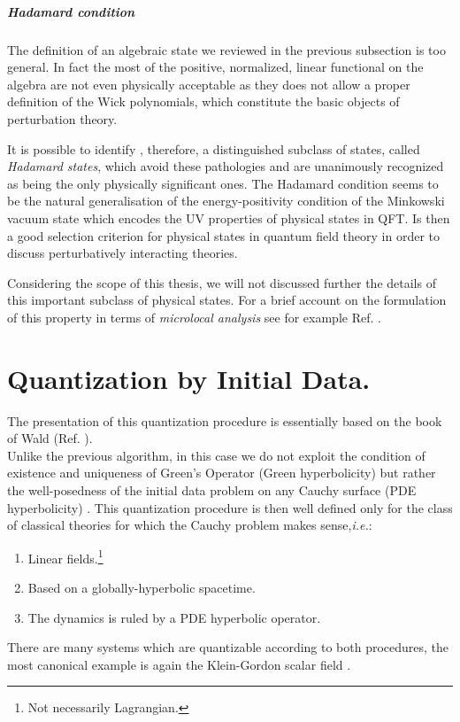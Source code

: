 \documentclass[Main]{subfiles}
\begin{document}
				\subparagraph{Hadamard condition}
					 The definition of an algebraic state we reviewed in the previous subsection is too general.
					 In fact the most of the positive, normalized, linear functional on the algebra are not even physically acceptable as they does not allow a proper definition of the Wick polynomials, which constitute the basic objects of perturbation theory.
					 
					 It is possible to identify , therefore, a distinguished subclass of states, called \emph{Hadamard states}, which avoid these pathologies and are unanimously recognized as being the only physically significant ones.
					 The Hadamard condition seems to be the natural generalisation of the energy-positivity condition of the Minkowski vacuum state which encodes the UV properties of physical states in QFT. Is then a good selection criterion for physical states in quantum field theory  in order  to discuss perturbatively interacting theories. 
					 	
				Considering the scope of this thesis, we will not discussed further the details of this important subclass of physical states.
				For a brief account on the formulation of this property in terms of  \emph{microlocal analysis} see for example Ref. \cite{Benini2013} \cite{Khavkine2014a}.
				
				


\section{Quantization by Initial Data.}
	The presentation of this quantization procedure is essentially based on the book of Wald  (Ref. \cite{Wald1994}).\\
	Unlike the previous algorithm, in this case we do not exploit the condition of existence and uniqueness of Green's Operator (Green hyperbolicity) but rather the well-posedness of the initial data problem on any Cauchy surface (PDE hyperbolicity) .
	This quantization procedure is then well defined  only for the class of classical theories for which the Cauchy problem %
	 makes sense,\textit{i.e.}:
	\begin{enumerate}
		\item Linear fields.\footnote{Not necessarily Lagrangian.}
		\item Based on a globally-hyperbolic spacetime.
		\item The dynamics is ruled by a PDE hyperbolic operator.	
	\end{enumerate}
	There are many systems  which are quantizable according to both procedures, the most canonical example is again the Klein-Gordon scalar field \cite{Wald1994}.
\end{document}
